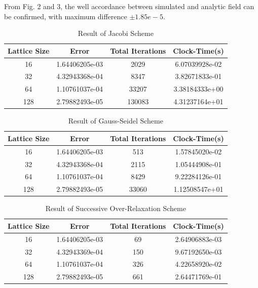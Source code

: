 \documentclass[a4paper,10pt]{article}
\begin{document}
\begin{large}
From Fig. 2 and 3, the well accordance between simulated and analytic field can be confirmed, with maximum difference $\pm1.85e-5$.

\begin{table}[h]  %
\centering  %
\begin{tabular}[t]{|c|c|c|c|}
\hline
Lattice Size & Error & Total Iterations & Clock-Time(s)\\
\hline
16&1.64406205e-03&2029&6.07039928e-02\\
\hline
32&4.32943368e-04 &8347&3.82671833e-01\\
\hline
64&1.10761037e-04&33207&3.38184333e+00\\
\hline
128&2.79882493e-05&130083&4.31237164e+01\\
\hline

\end{tabular}
\caption{Result of Jacobi Scheme}  %
\end{table}

\begin{table}[h]  %
\centering  %
\begin{tabular}[t]{|c|c|c|c|}
\hline
Lattice Size & Error & Total Iterations & Clock-Time(s)\\
\hline
16&1.64406205e-03&513&1.57845020e-02\\
\hline
32&4.32943368e-04&2115&1.05444908e-01\\
\hline
64&1.10761037e-04&8429&9.22284126e-01\\
\hline
128&2.79882493e-05&33060&1.12508547e+01\\
\hline

\end{tabular}
\caption{Result of Gauss-Seidel Scheme}  %
\end{table}

\begin{table}[h]  %
\centering  %
\begin{tabular}[t]{|c|c|c|c|}
\hline
Lattice Size & Error & Total Iterations & Clock-Time(s)\\
\hline
16&1.64406205e-03&69&2.64906883e-03\\
\hline
32&4.32943369e-04&150&9.67192650e-03\\
\hline
64&1.10761037e-04&326&4.22658920e-02\\
\hline
128& 2.79882493e-05&661&2.64471769e-01\\
\hline
\end{tabular}
\caption{Result of Successive Over-Relaxation Scheme}  %
\end{table}


\end{large}
\end{document}
